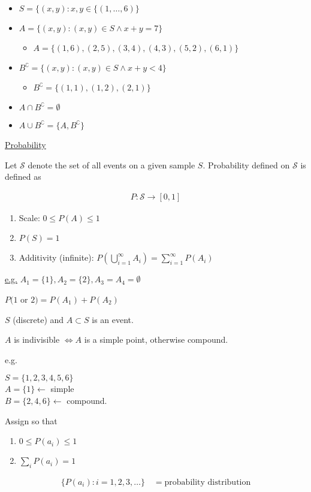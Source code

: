 \documentclass{article}
\begin{document}
\begin{itemize}
    \item $S = \{(x,y):x,y\in \{(1,\ldots,6)\}$
    \item $A = \{(x,y): (x,y) \in S \wedge x + y = 7\}$
    \begin{itemize}
        \item $A = \{(1,6),(2,5),(3,4),(4,3),(5,2),(6,1)\}$
    \end{itemize}
    \item $B^{\complement} = \{(x,y): (x,y) \in S \wedge x + y < 4\}$ 
    \begin{itemize}
        \item $B^{\complement} = \{(1,1),(1,2),(2,1)\}$
    \end{itemize}
    \item $A \cap B^{\complement} = \emptyset$
    \item $A \cup B^{\complement} = \{A, B^{\complement}\}$ 
\end{itemize}

\underline{Probability}

Let $\mathcal{S}$ denote the set of all events on a given sample $S$. Probability defined on $\mathcal{S}$ is defined as 

\begin{align*}
    P: \mathcal{S} \to [0,1]
\end{align*}

\begin{enumerate}
    \item Scale: $0 \le P(A) \le 1$
    \item $P(S) = 1$
    \item Additivity (infinite): $P(\bigcup_{i=1}^{\infty}A_i) = \sum_{i=1}^{\infty}P(A_i)$
\end{enumerate}

\underline{e.g.} $A_1 = \{1\}, A_2=\{2\}, A_3 = A_4 = \emptyset$

$P(1$ or $2) = P(A_1) + P(A_2)$

$S$ (discrete) and $A \subset S$ is an event. 

$A$ is indivisible $\iff A$ is a simple point, otherwise compound.

e.g.

$S = \{1,2,3,4,5,6\}$ \\
$A = \{1\} \leftarrow$ simple\\
$B = \{2,4,6\} \leftarrow$ compound.

Assign so that 

\begin{enumerate}
    \item $0 \le P(a_i) \le 1$
    \item $\sum_{i}P(a_i) = 1$
\end{enumerate}
\begin{align*}
    \{P(a_i): i = 1,2,3,\ldots\} \quad =\text{probability distribution}
\end{align*}
\end{document}
